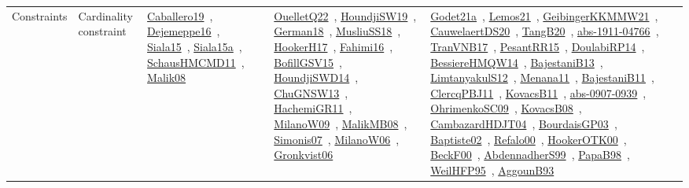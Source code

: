{\begin{longtable}{lp{3cm}>{\raggedright\arraybackslash}p{6cm}>{\raggedright\arraybackslash}p{6cm}>{\raggedright\arraybackslash}p{8cm}}
Constraints & Cardinality constraint & \href{../works/Caballero19.pdf}{Caballero19}~\cite{Caballero19}, \href{../works/Dejemeppe16.pdf}{Dejemeppe16}~\cite{Dejemeppe16}, \href{../works/Siala15.pdf}{Siala15}~\cite{Siala15}, \href{../works/Siala15a.pdf}{Siala15a}~\cite{Siala15a}, \href{../works/SchausHMCMD11.pdf}{SchausHMCMD11}~\cite{SchausHMCMD11}, \href{../works/Malik08.pdf}{Malik08}~\cite{Malik08} & \href{../works/OuelletQ22.pdf}{OuelletQ22}~\cite{OuelletQ22}, \href{../works/HoundjiSW19.pdf}{HoundjiSW19}~\cite{HoundjiSW19}, \href{../works/German18.pdf}{German18}~\cite{German18}, \href{../works/MusliuSS18.pdf}{MusliuSS18}~\cite{MusliuSS18}, \href{../works/HookerH17.pdf}{HookerH17}~\cite{HookerH17}, \href{../works/Fahimi16.pdf}{Fahimi16}~\cite{Fahimi16}, \href{../works/BofillGSV15.pdf}{BofillGSV15}~\cite{BofillGSV15}, \href{../works/HoundjiSWD14.pdf}{HoundjiSWD14}~\cite{HoundjiSWD14}, \href{../works/ChuGNSW13.pdf}{ChuGNSW13}~\cite{ChuGNSW13}, \href{../works/HachemiGR11.pdf}{HachemiGR11}~\cite{HachemiGR11}, \href{../works/MilanoW09.pdf}{MilanoW09}~\cite{MilanoW09}, \href{../works/MalikMB08.pdf}{MalikMB08}~\cite{MalikMB08}, \href{../works/Simonis07.pdf}{Simonis07}~\cite{Simonis07}, \href{../works/MilanoW06.pdf}{MilanoW06}~\cite{MilanoW06}, \href{../works/Gronkvist06.pdf}{Gronkvist06}~\cite{Gronkvist06} & \href{../works/Godet21a.pdf}{Godet21a}~\cite{Godet21a}, \href{../works/Lemos21.pdf}{Lemos21}~\cite{Lemos21}, \href{../works/GeibingerKKMMW21.pdf}{GeibingerKKMMW21}~\cite{GeibingerKKMMW21}, \href{../works/CauwelaertDS20.pdf}{CauwelaertDS20}~\cite{CauwelaertDS20}, \href{../works/TangB20.pdf}{TangB20}~\cite{TangB20}, \href{../works/abs-1911-04766.pdf}{abs-1911-04766}~\cite{abs-1911-04766}, \href{../works/TranVNB17.pdf}{TranVNB17}~\cite{TranVNB17}, \href{../works/PesantRR15.pdf}{PesantRR15}~\cite{PesantRR15}, \href{../works/DoulabiRP14.pdf}{DoulabiRP14}~\cite{DoulabiRP14}, \href{../works/BessiereHMQW14.pdf}{BessiereHMQW14}~\cite{BessiereHMQW14}, \href{../works/BajestaniB13.pdf}{BajestaniB13}~\cite{BajestaniB13}, \href{../works/LimtanyakulS12.pdf}{LimtanyakulS12}~\cite{LimtanyakulS12}, \href{../works/Menana11.pdf}{Menana11}~\cite{Menana11}, \href{../works/BajestaniB11.pdf}{BajestaniB11}~\cite{BajestaniB11}, \href{../works/ClercqPBJ11.pdf}{ClercqPBJ11}~\cite{ClercqPBJ11}, \href{../works/KovacsB11.pdf}{KovacsB11}~\cite{KovacsB11}, \href{../works/abs-0907-0939.pdf}{abs-0907-0939}~\cite{abs-0907-0939}, \href{../works/OhrimenkoSC09.pdf}{OhrimenkoSC09}~\cite{OhrimenkoSC09}, \href{../works/KovacsB08.pdf}{KovacsB08}~\cite{KovacsB08}, \href{../works/CambazardHDJT04.pdf}{CambazardHDJT04}~\cite{CambazardHDJT04}, \href{../works/BourdaisGP03.pdf}{BourdaisGP03}~\cite{BourdaisGP03}, \href{../works/Baptiste02.pdf}{Baptiste02}~\cite{Baptiste02}, \href{../works/Refalo00.pdf}{Refalo00}~\cite{Refalo00}, \href{../works/HookerOTK00.pdf}{HookerOTK00}~\cite{HookerOTK00}, \href{../works/BeckF00.pdf}{BeckF00}~\cite{BeckF00}, \href{../works/AbdennadherS99.pdf}{AbdennadherS99}~\cite{AbdennadherS99}, \href{../works/PapaB98.pdf}{PapaB98}~\cite{PapaB98}, \href{../works/WeilHFP95.pdf}{WeilHFP95}~\cite{WeilHFP95}, \href{../works/AggounB93.pdf}{AggounB93}~\cite{AggounB93}\\

\end{longtable}}
